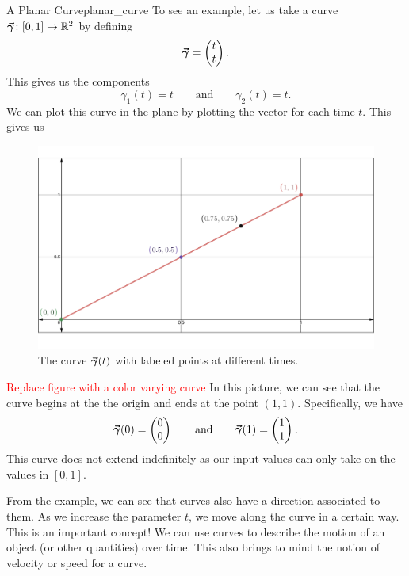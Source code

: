         \begin{ex}{A Planar Curve}{planar_curve}
        	To see an example, let us take a curve $\boldsymbol{\vec{\gamma}} \colon [0,1] \to \mathbb{R}^2$ by defining
        	\[
        	\boldsymbol{\vec{\gamma}} = \begin{pmatrix} t \\ t \end{pmatrix}.
        	\]
        	This gives us the components
        	\[
        	\gamma_1(t) = t \qquad \textrm{and} \qquad \gamma_2(t) = t.
        	\]
        	We can plot this curve in the plane by plotting the vector for each time $t$. This gives us
        	\begin{figure}[H]
        		\centering
        		\includegraphics[width=.9\textwidth]{Figures_Part_6/straight_line_curve.pdf}
        		\caption{The curve $\boldsymbol{\vec{\gamma}}(t)$ with labeled points at different times.}
        	\end{figure}
            \textcolor{red}{Replace figure with a color varying curve}
        	In this picture, we can see that the curve begins at the the origin and ends at the point $(1,1)$.  Specifically, we have
        	\[
        	\boldsymbol{\vec{\gamma}}(0) = \begin{pmatrix} 0 \\ 0 \end{pmatrix} \qquad \textrm{and} \qquad \boldsymbol{\vec{\gamma}}(1) = \begin{pmatrix} 1 \\ 1 \end{pmatrix}.
        	\]
        	This curve does not extend indefinitely as our input values can only take on the values in $[0,1]$.
        \end{ex}
        
        From the example, we can see that curves also have a direction associated to them.  As we increase the parameter $t$, we move along the curve in a certain way.  This is an important concept! We can use curves to describe the motion of an object (or other quantities) over time.  This also brings to mind the notion of velocity or speed for a curve.  
        
